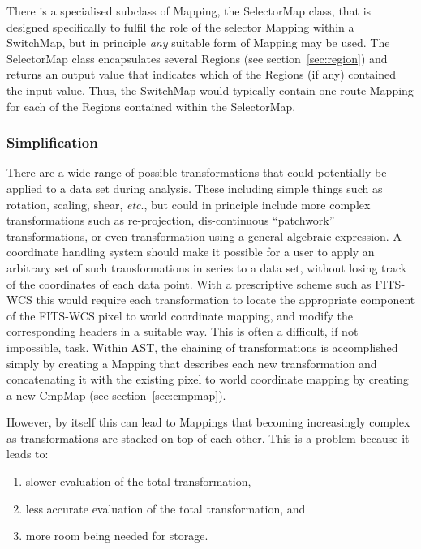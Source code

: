 \documentclass[final,authoryear,5p,times,twocolumn]{elsarticle}
\begin{document}
\begin{description}
There is a specialised subclass of Mapping, the SelectorMap class, that
is designed specifically to fulfil the role of the selector Mapping
within a SwitchMap, but in principle \emph{any} suitable form of Mapping
may be used. The SelectorMap class encapsulates several Regions (see
section~\ref{sec:region}) and returns an output value that indicates
which of the  Regions (if any) contained the input value. Thus, the
SwitchMap would typically contain one route Mapping for each of the
Regions contained within the SelectorMap.

\end{description}


\subsubsection{Simplification}
\label{sec:simplification}

There are a wide range of possible transformations that could
potentially be applied to a data set during analysis. These
including simple things such as rotation, scaling, shear, \emph{etc}., but
could in principle include more complex transformations such as
re-projection, dis-continuous ``patchwork'' transformations, or even
transformation using a general algebraic expression.  A coordinate
handling system should make it possible for a user to apply an
arbitrary set of such transformations in series to a data set, without
losing track of the coordinates of each data point. With a
prescriptive scheme such as FITS-WCS this would require each
transformation to locate the appropriate component of the FITS-WCS
pixel to world coordinate mapping, and modify the corresponding
headers in a suitable way. This is often a difficult, if not
impossible, task. Within AST, the chaining of transformations is
accomplished simply by creating a Mapping that describes each new
transformation and concatenating it with the existing pixel to world
coordinate mapping by creating a new CmpMap (see section~\ref{sec:cmpmap}).

However, by itself this can lead to Mappings that becoming increasingly
complex as transformations are stacked on top of each other. This is
a problem because it leads to:

\begin{enumerate}
\item slower evaluation of the total transformation,
\item less accurate evaluation of the total transformation, and
\item more room being needed for storage.
\end{enumerate}
\end{document}
